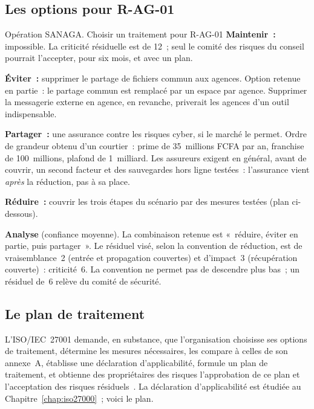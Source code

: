 \subsection{Les options pour R-AG-01}

\begin{boxscenario}{Opération SANAGA. Choisir un traitement pour R-AG-01}
\textbf{Maintenir~:} impossible. La criticité résiduelle est de 12~; seul
le comité des risques du conseil pourrait l'accepter, pour six mois, et
avec un plan.

\medskip
\textbf{Éviter~:} supprimer le partage de fichiers commun aux agences.
Option retenue en partie~: le partage commun est remplacé par un espace
par agence. Supprimer la messagerie externe en agence, en revanche,
priverait les agences d'un outil indispensable.

\medskip
\textbf{Partager~:} une assurance contre les risques cyber, si le marché
le permet. Ordre de grandeur obtenu d'un courtier~: prime de 35~millions
FCFA par an, franchise de 100~millions, plafond de 1~milliard. Les
assureurs exigent en général, avant de couvrir, un second facteur et des
sauvegardes hors ligne testées~: l'assurance vient \emph{après} la
réduction, pas à sa place.

\medskip
\textbf{Réduire~:} couvrir les trois étapes du scénario par des mesures
testées (plan ci-dessous).

\medskip
\textbf{Analyse} (confiance moyenne). La combinaison retenue est
«~réduire, éviter en partie, puis partager~». Le résiduel visé, selon la
convention de réduction, est de vraisemblance~2 (entrée et propagation
couvertes) et d'impact~3 (récupération couverte)~: criticité~6. La
convention ne permet pas de descendre plus bas~; un résiduel de~6 relève
du comité de sécurité.
\end{boxscenario}

\subsection{Le plan de traitement}

L'ISO/IEC~27001 demande, en substance, que l'organisation choisisse ses
options de traitement, détermine les mesures nécessaires, les compare à
celles de son annexe~A, établisse une déclaration d'applicabilité, formule
un plan de traitement, et obtienne des propriétaires des risques
l'approbation de ce plan et l'acceptation des risques
résiduels~\cite{iso27001_2022}. La déclaration d'applicabilité est étudiée
au Chapitre~\ref{chap:iso27000}~; voici le plan.

